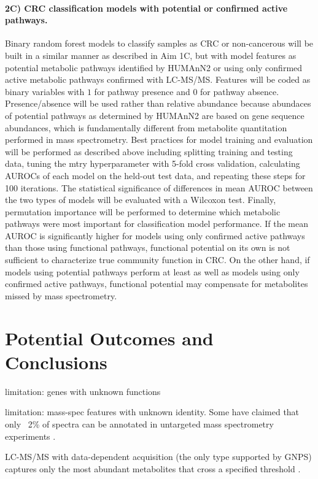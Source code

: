 \documentclass[11pt]{article}
\begin{document}
\paragraph{2C) CRC classification models with potential or confirmed active pathways.}

Binary random forest models to classify samples as CRC or non-cancerous will be built in a similar manner as described in Aim 1C, but with model features as potential metabolic pathways identified by HUMAnN2 or using only confirmed active metabolic pathways confirmed with LC-MS/MS.
Features will be coded as binary variables with $1$ for pathway presence and $0$ for pathway absence.
Presence/absence will be used rather than relative abundance because abundaces of potential pathways as determined by HUMAnN2 are based on gene sequence abundances, which is fundamentally different from metabolite quantitation performed in mass spectrometry.
Best practices for model training and evaluation will be performed as described above including splitting training and testing data, tuning the mtry hyperparameter with 5-fold cross validation, calculating AUROCs of each model on the held-out test data, and repeating these steps for 100 iterations.
The statistical significance of differences in mean AUROC between the two types of models will be evaluated with a Wilcoxon test.
Finally, permutation importance will be performed to determine which metabolic pathways were most important for classification model performance.
If the mean AUROC is significantly higher for models using only confirmed active pathways than those using functional pathways,
functional potential on its own is not sufficient to characterize true community function in CRC.
On the other hand, if models using potential pathways perform at least as well as models using only confirmed active pathways,
functional potential may compensate for metabolites missed by mass spectrometry.

\section*{Potential Outcomes and Conclusions}

limitation: genes with unknown functions

limitation: mass-spec features with unknown identity. Some have claimed that only ~2\% of spectra can be annotated in untargeted mass spectrometry experiments \cite{da_silva_illuminating_2015}.

LC-MS/MS with data-dependent acquisition (the only type supported by GNPS) captures only the most abundant metabolites that cross a specified threshold \cite{xiao_metabolite_2012}.
\end{document}
